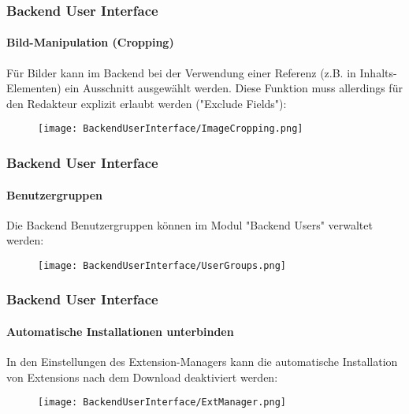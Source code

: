 \begin{frame}[fragile]
	\frametitle{Backend User Interface}
	\framesubtitle{Bild-Manipulation (Cropping)}

	Für Bilder kann im Backend bei der Verwendung einer Referenz (z.B. in
	Inhalts-Elementen) ein Ausschnitt ausgewählt werden. Diese Funktion muss
	allerdings für den Redakteur explizit erlaubt werden ("Exclude Fields"):

	\begin{figure}
		\texttt{[image: BackendUserInterface/ImageCropping.png]}
	\end{figure}

\end{frame}

\begin{frame}[fragile]
	\frametitle{Backend User Interface}
	\framesubtitle{Benutzergruppen}

	Die Backend Benutzergruppen können im Modul "Backend Users" verwaltet werden:

	\begin{figure}
		\texttt{[image: BackendUserInterface/UserGroups.png]}
	\end{figure}

\end{frame}

\begin{frame}[fragile]
	\frametitle{Backend User Interface}
	\framesubtitle{Automatische Installationen unterbinden}

	In den Einstellungen des Extension-Managers kann die automatische Installation
	von Extensions nach dem Download deaktiviert werden:

	\begin{figure}
		\texttt{[image: BackendUserInterface/ExtManager.png]}
	\end{figure}

\end{frame}

